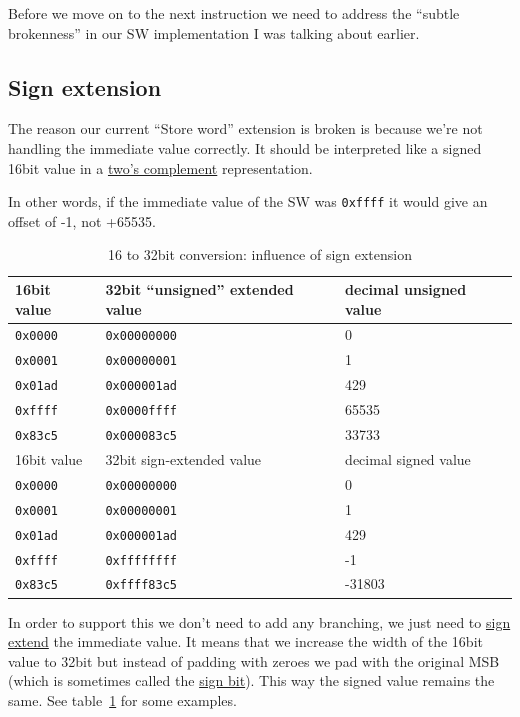 \documentclass[a4paper]{article}
\newcommand{\code}[1] {\texttt{#1}}
\begin{document}
Before we move on to the next instruction we need to address the
``subtle brokenness'' in our SW implementation I was talking about
earlier.

\subsection{Sign extension}

The reason our current ``Store word'' extension is broken is because
we're not handling the immediate value correctly. It should be
interpreted like a signed 16bit value in a
\href{https://en.wikipedia.org/wiki/Two%27s_complement}{two's complement}
representation.

In other words, if the immediate value of the SW was \code{0xffff}
it would give an offset of -1, not +65535.

\begin{table}[ht]
  \centering

  \begin{tabular}{ l | l | l }
    16bit value & 32bit ``unsigned'' extended value & decimal unsigned value \\
    \hline
    \code{0x0000} & \code{0x00000000} & 0     \\
    \code{0x0001} & \code{0x00000001} & 1     \\
    \code{0x01ad} & \code{0x000001ad} & 429   \\
    \code{0xffff} & \code{0x0000ffff} & 65535 \\
    \code{0x83c5} & \code{0x000083c5} & 33733 \\
    \hline
    \hline
    16bit value & 32bit sign-extended value & decimal signed value \\
    \hline
    \code{0x0000} & \code{0x00000000} & 0      \\
    \code{0x0001} & \code{0x00000001} & 1      \\
    \code{0x01ad} & \code{0x000001ad} & 429    \\
    \code{0xffff} & \code{0xffffffff} & -1     \\
    \code{0x83c5} & \code{0xffff83c5} & -31803 \\
  \end{tabular}

  \caption{16 to 32bit conversion: influence of sign extension}
  \label{tab:signextend}
\end{table}

In order to support this we don't need to add any branching, we just
need to \href{https://en.wikipedia.org/wiki/Sign_extension}{sign
  extend} the immediate value. It means that we increase the width of
the 16bit value to 32bit but instead of padding with zeroes we pad
with the original MSB (which is sometimes called the
\href{https://en.wikipedia.org/wiki/Sign_bit}{sign bit}). This way the
signed value remains the same. See table~\ref{tab:signextend} for some
examples.
\end{document}
